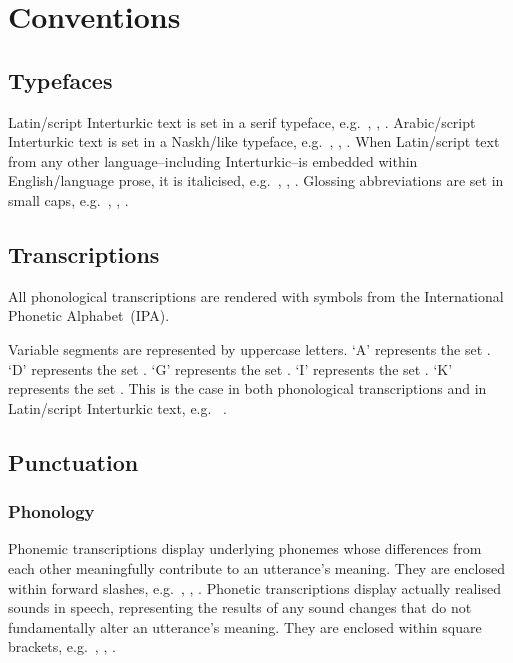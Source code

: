 \chapter{Conventions}

\section*{Typefaces}

Latin\-/script Interturkic text is set in a serif typeface,
e.g.\ , , .
Arabic\-/script Interturkic text is set in a Naskh\-/like typeface,
e.g.\ , , .
When Latin\-/script text from any other language\---including Interturkic\---is
embedded within English\-/language prose, it is italicised,
e.g.\ , , .
Glossing abbreviations are set in small caps,
e.g.\ \Fpl, \Abl, \Pst.

\section*{Transcriptions}

All phonological transcriptions are rendered with symbols from the International
Phonetic Alphabet~(IPA).

Variable segments are represented by uppercase letters.
`A' represents the set .
`D' represents the set .
`G' represents the set .
`I' represents the set .
`K' represents the set .
This is the case in both phonological transcriptions and in Latin\-/script
Interturkic text,
e.g.\  
\inlinegls{\Gen}.

\section*{Punctuation}

\subsection*{Phonology}

Phonemic transcriptions display underlying phonemes whose differences from
each other meaningfully contribute to an utterance's meaning.
They are enclosed within forward slashes,
e.g.\ , , .
Phonetic transcriptions display actually realised sounds in speech,
representing the results of any sound changes that do not fundamentally alter
an utterance's meaning.
They are enclosed within square brackets,
e.g.\ , , .

